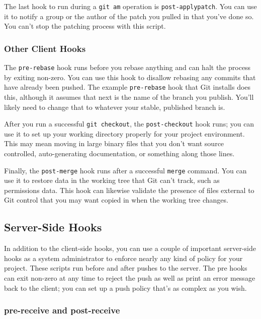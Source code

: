 \documentclass[a4paper]{book}
\newcounter{tab}[chapter]
\begin{document}
The last hook to run during a \texttt{git am} operation is \texttt{post-applypatch}. You can use it to notify a group or the author of the patch you pulled in that you've done so. You can't stop the patching process with this script.

\subsubsection{Other Client Hooks}

The \texttt{pre-rebase} hook runs before you rebase anything and can halt the process by exiting non-zero. You can use this hook to disallow rebasing any commits that have already been pushed. The example \texttt{pre-rebase} hook that Git installs does this, although it assumes that next is the name of the branch you publish. You'll likely need to change that to whatever your stable, published branch is.

After you run a successful \texttt{git checkout}, the \texttt{post-checkout} hook runs; you can use it to set up your working directory properly for your project environment. This may mean moving in large binary files that you don't want source controlled, auto-generating documentation, or something along those lines.

Finally, the \texttt{post-merge} hook runs after a successful \texttt{merge} command. You can use it to restore data in the working tree that Git can't track, such as permissions data. This hook can likewise validate the presence of files external to Git control that you may want copied in when the working tree changes.

\subsection{Server-Side Hooks}\label{server-side-hooks}

In addition to the client-side hooks, you can use a couple of important server-side hooks as a system administrator to enforce nearly any kind of policy for your project. These scripts run before and after pushes to the server. The pre hooks can exit non-zero at any time to reject the push as well as print an error message back to the client; you can set up a push policy that's as complex as you wish.

\subsubsection{pre-receive and post-receive}
\end{document}
